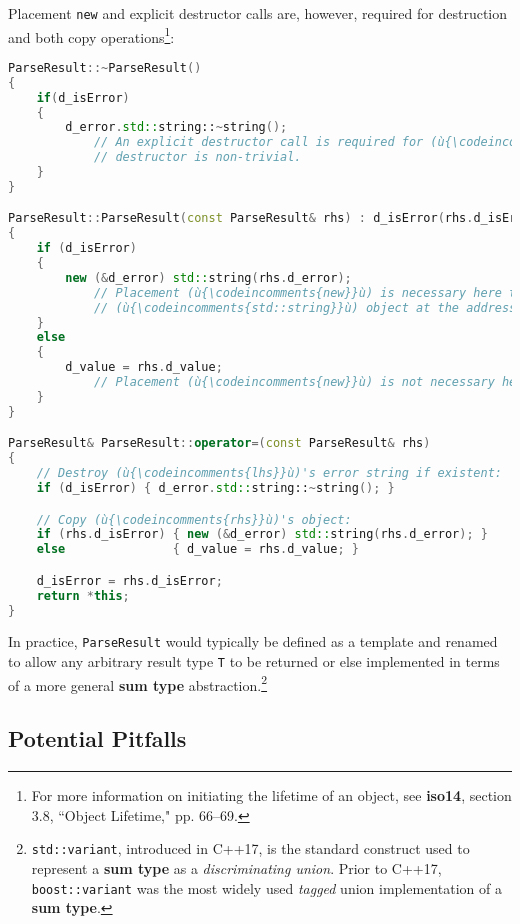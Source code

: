 \noindent Placement \texttt{new} and explicit destructor calls are, however,
required for destruction and both copy operations{\cprotect\footnote{For
more information on initiating the lifetime of an object, see \textbf{iso14}, section 3.8, ``Object Lifetime," pp. 66--69.}}:

\begin{lstlisting}[language=C++]
ParseResult::~ParseResult()
{
    if(d_isError)
    {
        d_error.std::string::~string();
            // An explicit destructor call is required for (ù{\codeincomments{d\_error}}ù) because its
            // destructor is non-trivial.
    }
}

ParseResult::ParseResult(const ParseResult& rhs) : d_isError(rhs.d_isError)
{
    if (d_isError)
    {
        new (&d_error) std::string(rhs.d_error);
            // Placement (ù{\codeincomments{new}}ù) is necessary here to begin the lifetime of a
            // (ù{\codeincomments{std::string}}ù) object at the address of (ù{\codeincomments{d\_error}}ù).
    }
    else
    {
        d_value = rhs.d_value;
            // Placement (ù{\codeincomments{new}}ù) is not necessary here as (ù{\codeincomments{int}}ù) is a trivial type.
    }
}

ParseResult& ParseResult::operator=(const ParseResult& rhs)
{
    // Destroy (ù{\codeincomments{lhs}}ù)'s error string if existent:
    if (d_isError) { d_error.std::string::~string(); }

    // Copy (ù{\codeincomments{rhs}}ù)'s object:
    if (rhs.d_isError) { new (&d_error) std::string(rhs.d_error); }
    else               { d_value = rhs.d_value; }

    d_isError = rhs.d_isError;
    return *this;
}
\end{lstlisting}
    
\noindent In practice, \texttt{ParseResult} would typically be defined as a
template and renamed to allow any arbitrary result type \texttt{T} to be
returned or else implemented in terms of a more general \textbf{sum
type} abstraction.{\cprotect\footnote{\texttt{std::variant}, introduced
in C++17, is the standard construct used to represent a \textbf{sum
type} as a \emph{discriminating union}. Prior to C++17,
\texttt{boost::variant} was the most widely used \emph{tagged} union
  implementation of a \textbf{sum type}.}}

\subsection[Potential Pitfalls]{Potential Pitfalls}\label{potential-pitfalls}

